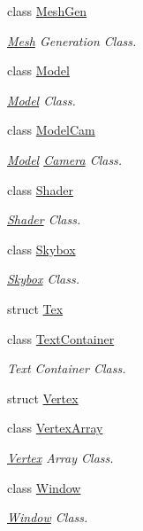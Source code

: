 \begin{DoxyCompactItemize}
class \hyperlink{classspork_1_1graphics_1_1_mesh_gen}{Mesh\+Gen}
\begin{DoxyCompactList}\small\item\em \hyperlink{classspork_1_1graphics_1_1_mesh}{Mesh} Generation Class. \end{DoxyCompactList}\item 
class \hyperlink{classspork_1_1graphics_1_1_model}{Model}
\begin{DoxyCompactList}\small\item\em \hyperlink{classspork_1_1graphics_1_1_model}{Model} Class. \end{DoxyCompactList}\item 
class \hyperlink{classspork_1_1graphics_1_1_model_cam}{Model\+Cam}
\begin{DoxyCompactList}\small\item\em \hyperlink{classspork_1_1graphics_1_1_model}{Model} \hyperlink{classspork_1_1graphics_1_1_camera}{Camera} Class. \end{DoxyCompactList}\item 
class \hyperlink{classspork_1_1graphics_1_1_shader}{Shader}
\begin{DoxyCompactList}\small\item\em \hyperlink{classspork_1_1graphics_1_1_shader}{Shader} Class. \end{DoxyCompactList}\item 
class \hyperlink{classspork_1_1graphics_1_1_skybox}{Skybox}
\begin{DoxyCompactList}\small\item\em \hyperlink{classspork_1_1graphics_1_1_skybox}{Skybox} Class. \end{DoxyCompactList}\item 
struct \hyperlink{structspork_1_1graphics_1_1_tex}{Tex}
\item 
class \hyperlink{classspork_1_1graphics_1_1_text_container}{Text\+Container}
\begin{DoxyCompactList}\small\item\em Text Container Class. \end{DoxyCompactList}\item 
struct \hyperlink{structspork_1_1graphics_1_1_vertex}{Vertex}
\item 
class \hyperlink{classspork_1_1graphics_1_1_vertex_array}{Vertex\+Array}
\begin{DoxyCompactList}\small\item\em \hyperlink{structspork_1_1graphics_1_1_vertex}{Vertex} Array Class. \end{DoxyCompactList}\item 
class \hyperlink{classspork_1_1graphics_1_1_window}{Window}
\begin{DoxyCompactList}\small\item\em \hyperlink{classspork_1_1graphics_1_1_window}{Window} Class. \end{DoxyCompactList}\end{DoxyCompactItemize}
